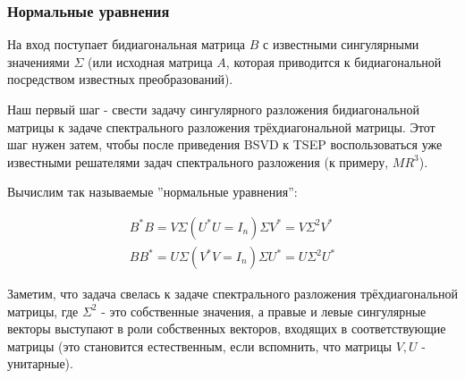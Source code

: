 

\subsubsection{Нормальные уравнения}

На вход поступает бидиагональная матрица $B$ с известными сингулярными значениями $\Sigma$ (или исходная матрица $A$, которая приводится к бидиагональной посредством известных преобразований).

Наш первый шаг - свести задачу сингулярного разложения бидиагональной матрицы к задаче спектрального разложения трёхдиагональной матрицы. Этот шаг нужен затем, чтобы после приведения BSVD к TSEP воспользоваться уже известными решателями задач спектрального разложения (к примеру, $MR^3$).

Вычислим так называемые ''нормальные уравнения'':

\begin{equation} \label{Norm_eq}
    \begin{split}
        B^*B=V \Sigma (U^*U=I_n) \Sigma V^*=V \Sigma^2 V^*\\
        BB^*=U\Sigma (V^* V=I_n) \Sigma U^*=U \Sigma^2 U^*
    \end{split}
\end{equation}

Заметим, что задача свелась к задаче спектрального разложения трёхдиагональной матрицы, где $\Sigma^2$ - это собственные значения, а правые и левые сингулярные векторы выступают в роли собственных векторов, входящих в соответствующие матрицы (это становится естественным, если вспомнить, что матрицы \(V,U\) - унитарные). 

